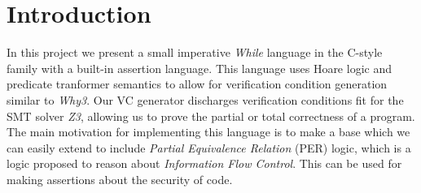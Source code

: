 \section{Introduction}












In this project we present a small imperative \textit{While} language in the C-style family with a built-in assertion language.
This language uses Hoare logic and predicate tranformer semantics to allow for verification condition generation similar to \textit{Why3}.
Our VC generator discharges verification conditions fit for the SMT solver \textit{Z3}, allowing us to prove the partial or total correctness of a program.
The main motivation for implementing this language is to make a base which we can easily extend to include \textit{Partial Equivalence Relation} (PER) logic, which is a logic proposed to reason about \textit{Information Flow Control}\cite{}. This can be used for making assertions about the security of code.

